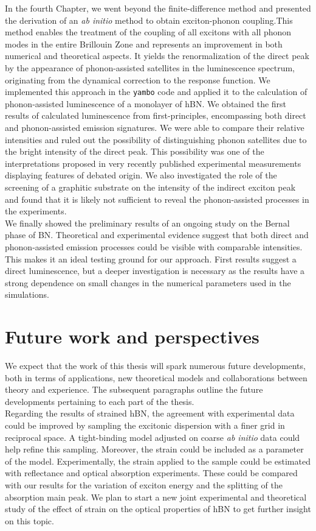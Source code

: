In the fourth Chapter, we went beyond the finite-difference method and presented the derivation of an \textit{ab initio} method to obtain exciton-phonon coupling.This method enables the treatment of the coupling of all excitons with all phonon modes in the entire Brillouin Zone and represents an improvement in both numerical and theoretical aspects. It yields the renormalization of the direct peak by the appearance of phonon-assisted satellites in the luminescence spectrum, originating from the dynamical correction to the response function. 
We implemented this approach in the \texttt{yambo} code and applied it to the calculation of phonon-assisted luminescence of
a monolayer of hBN. We obtained the first results of calculated luminescence from first-principles, encompassing both direct and phonon-assisted emission signatures. We were able to compare their relative intensities and ruled out the possibility of distinguishing phonon satellites due to the bright intensity of the direct peak. This possibility was one of the interpretations proposed in very recently published experimental measurements displaying features of debated origin. 
We also investigated the role of the screening of a graphitic substrate on the intensity of the indirect exciton peak and found that it is likely not sufficient to reveal the phonon-assisted processes in the experiments. \\

We finally showed the preliminary results of an ongoing study on the Bernal phase of BN. Theoretical and experimental evidence suggest that both direct and phonon-assisted emission processes could be visible with comparable intensities. This makes it an ideal testing ground for our approach. First results suggest a direct luminescence, but a deeper investigation is necessary as the results have a strong dependence on small changes in the numerical parameters used in the simulations.

\section*{Future work and perspectives}
We expect that the work of this thesis will spark numerous future developments, both in terms of applications, new theoretical models and collaborations between theory and experience. The subsequent paragraphs outline the future developments pertaining to each part of the thesis.\\

Regarding the results of strained \acrshort{hBN}, the agreement with experimental data could be improved by sampling the excitonic dispersion with a finer grid in reciprocal space. A tight-binding model adjusted on coarse \textit{ab initio} data could help refine this sampling. Moreover, the strain could be included as a parameter of the model. Experimentally, the strain applied to the sample could be estimated with reflectance and optical absorption experiments. These could be compared with our results for the variation of exciton energy and the splitting of the absorption main peak. We plan to start a new joint experimental and theoretical study of the effect of strain on the optical properties of \acrshort{hBN} to get further insight on this topic. \\

